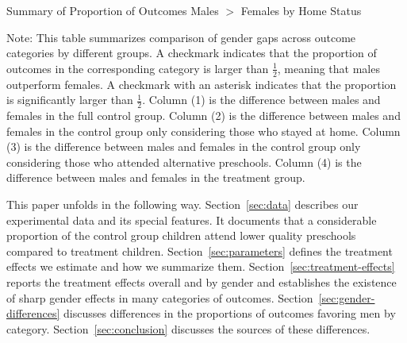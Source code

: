 \begin{table}[H]
\centering
\caption{Summary of Proportion of Outcomes Males $>$ Females by Home Status}
\label{tab:proportion-table}
\begin{threeparttable}

\begin{tablenotes}
\footnotesize
\item Note: This table summarizes comparison of gender gaps across outcome categories by different groups. A checkmark indicates that the proportion of outcomes in the corresponding category is larger than $\frac{1}{2}$, meaning that males outperform females. A checkmark with an asterisk indicates that the proportion is significantly larger than $\frac{1}{2}$. Column (1) is the difference between males and females in the full control group.  Column (2) is the difference between males and females in the control group only considering those who stayed at home. Column (3) is the difference between males and females in the control group only considering those who attended alternative preschools. Column (4) is the difference between males and females in the treatment group.
\end{tablenotes}
\end{threeparttable}
\end{table}

This paper unfolds in the following way. Section~\ref{sec:data} describes our experimental data and its special features. It documents that a considerable proportion of the control group children attend lower quality preschools compared to treatment children. Section~\ref{sec:parameters} defines the treatment effects we estimate and how we summarize them. Section~\ref{sec:treatment-effects} reports the treatment effects overall and by gender and establishes the existence of sharp gender effects in many categories of outcomes. Section~\ref{sec:gender-differences} discusses differences in the proportions of outcomes favoring men by category. Section~\ref{sec:conclusion} discusses the sources of these differences.


